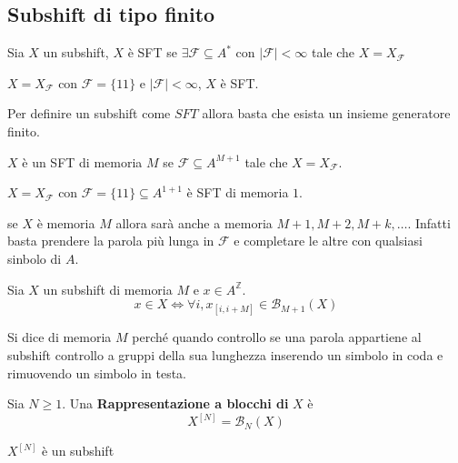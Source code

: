 \subsection{Subshift di tipo finito}
\begin{definizione} 
    Sia $X$ un subshift, $X$ è SFT se $\exists \mathcal{F}\subseteq A^\ast$ con
    $|\mathcal{F}|<\infty$ tale che $X= X_\mathcal{F}$
\end{definizione}

\begin{esempio}
    $X=X_\mathcal{F}$ con $\mathcal{F} = \{11\}$ e $|\mathcal{F}|<\infty$, $X$ è
    SFT.
\end{esempio}

Per definire un subshift come $SFT$ allora basta che esista un insieme generatore
finito.
\begin{definizione}
    $X$ è un SFT di memoria $M$ se  $\mathcal{F}\subseteq A^{M+1}$ tale che $X=X_\mathcal{F}$.
\end{definizione}

\begin{esempio}
    $X=X_\mathcal{F}$ con $\mathcal{F} = \{11\}\subseteq A^{1+1}$ è
    SFT di memoria $1$.
\end{esempio}

\begin{nota}
    se $X$ è memoria $M$ allora sarà anche a memoria $M+1,M+2,M+k,\dots$. Infatti 
    basta prendere la parola più lunga in $\mathcal{F}$ e completare le altre 
    con qualsiasi sinbolo di $A$.
\end{nota}

\begin{teorema}
    Sia $X$ un subshift di memoria $M$ e $x\in A^{\mathbb{Z}}$.
    $$x\in X\iff \forall i, x_{[i,i+M]}\in \mathcal{B}_{M+1}(X)$$
\end{teorema}
Si dice di memoria $M$ perché quando controllo se una parola appartiene al subshift
controllo a gruppi della sua lunghezza inserendo un simbolo in coda e rimuovendo un 
simbolo in testa.

\begin{definizione}  
    Sia $N\ge 1$. Una \textbf{Rappresentazione a blocchi di} $X$ è 
    $$X^{[N]} = \mathcal{B}_N (X)$$
\end{definizione}

\begin{teorema}
    $X^{[N]} $ è un subshift
\end{teorema}

